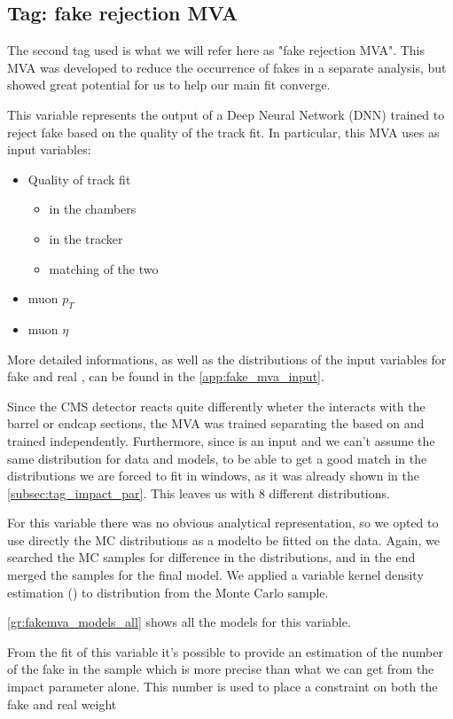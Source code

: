 \subsection{Tag: fake rejection MVA}
\label{subsec:tag_fake_mva}

The second tag used is what we will refer here as "fake rejection MVA".
This MVA was developed to reduce the occurrence of fakes in a separate analysis, but showed great potential for us to help our main fit converge.

This variable represents the output of a Deep Neural Network (DNN) trained to reject fake \Pgm based on the quality of the track fit.
In particular, this MVA uses as input variables:
\begin{itemize}
	\item Quality of track fit
		\begin{itemize}
			\item in the \Pgm chambers
			\item in the tracker
			\item matching of the two
		\end{itemize}
	\item muon $p_T$
	\item muon $\eta$
\end{itemize}

More detailed informations, as well as the distributions of the input variables for fake and real \Pgm, can be found in the \autoref{app:fake_mva_input}.

Since the CMS detector reacts quite differently wheter the \Pgm interacts with the barrel or endcap sections, the MVA was trained separating the \Pgm based on \psrap and trained independently.
Furthermore, since \pt is an input and we can't assume the same \pt distribution for data and models, to be able to get a good match in the distributions we are forced to fit in \pt windows, as it was already shown in the \autoref{subsec:tag_impact_par}.
This leaves us with 8 different distributions.

For this variable there was no obvious analytical representation, so we opted to use directly the MC distributions as a modelto be fitted on the data.
Again, we searched the MC samples for difference in the distributions, and in the end merged the samples for the final model.
We applied a variable kernel density estimation (\cite{bib:kernel_est}) to distribution from the Monte Carlo sample.

\autoref{gr:fakemva_models_all} shows all the models for this variable.


From the fit of this variable it's possible to provide an estimation of the number of the fake \Pgm in the sample which is more precise than what we can get from the impact parameter alone. 
This number is used to place a constraint on both the fake and real \Pgm weight

